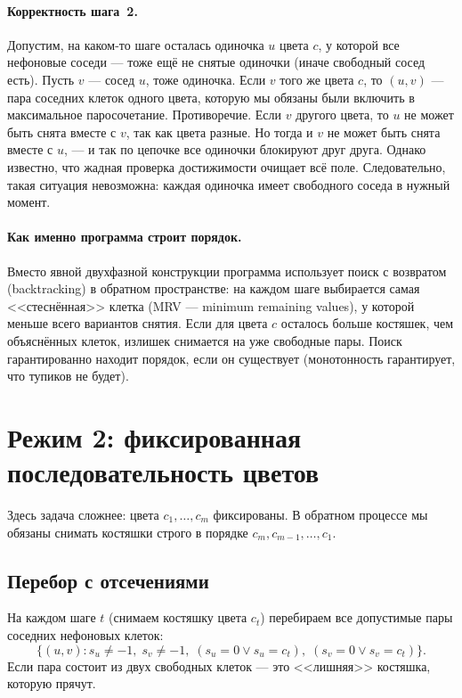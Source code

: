 \documentclass[12pt,a4paper]{article}
\begin{document}
\paragraph{Корректность шага~2.}
Допустим, на каком-то шаге осталась одиночка $u$ цвета $c$, у которой
все нефоновые соседи --- тоже ещё не снятые одиночки (иначе свободный
сосед есть). Пусть $v$ --- сосед $u$, тоже одиночка. Если $v$ того же
цвета $c$, то $(u,v)$ --- пара соседних клеток одного цвета, которую мы
обязаны были включить в максимальное паросочетание. Противоречие. Если
$v$ другого цвета, то $u$ не может быть снята вместе с $v$, так как
цвета разные. Но тогда и $v$ не может быть снята вместе с $u$, --- и так
по цепочке все одиночки блокируют друг друга. Однако известно, что
жадная проверка достижимости очищает всё поле. Следовательно, такая
ситуация невозможна: каждая одиночка имеет свободного соседа в нужный
момент.

\paragraph{Как именно программа строит порядок.}
Вместо явной двухфазной конструкции программа использует поиск с возвратом
(backtracking) в обратном пространстве: на каждом шаге выбирается самая
<<стеснённая>> клетка (MRV --- minimum remaining values), у которой
меньше всего вариантов снятия. Если для цвета $c$ осталось больше
костяшек, чем объяснённых клеток, излишек снимается на уже свободные
пары. Поиск гарантированно находит порядок, если он существует
(монотонность гарантирует, что тупиков не будет).

\section{Режим 2: фиксированная последовательность цветов}

Здесь задача сложнее: цвета $c_1,\dots,c_m$ фиксированы. В обратном
процессе мы обязаны снимать костяшки строго в порядке
$c_m,c_{m-1},\dots,c_1$.

\subsection{Перебор с отсечениями}

На каждом шаге $t$ (снимаем костяшку цвета $c_t$) перебираем все
допустимые пары соседних нефоновых клеток:
\[
  \{(u,v): s_u \ne -1,\; s_v \ne -1,\; (s_u=0 \vee s_u=c_t),\;
        (s_v=0 \vee s_v=c_t)\}.
\]
Если пара состоит из двух свободных клеток --- это <<лишняя>> костяшка,
которую прячут.
\end{document}
